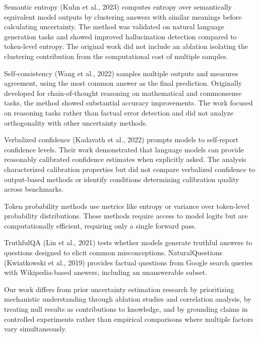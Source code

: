 
Semantic entropy (Kuhn et al., 2023) computes entropy over semantically equivalent model outputs by clustering answers with similar meanings before calculating uncertainty. The method was validated on natural language generation tasks and showed improved hallucination detection compared to token-level entropy. The original work did not include an ablation isolating the clustering contribution from the computational cost of multiple samples.

Self-consistency (Wang et al., 2022) samples multiple outputs and measures agreement, using the most common answer as the final prediction. Originally developed for chain-of-thought reasoning on mathematical and commonsense tasks, the method showed substantial accuracy improvements. The work focused on reasoning tasks rather than factual error detection and did not analyze orthogonality with other uncertainty methods.

Verbalized confidence (Kadavath et al., 2022) prompts models to self-report confidence levels. Their work demonstrated that language models can provide reasonably calibrated confidence estimates when explicitly asked. The analysis characterized calibration properties but did not compare verbalized confidence to output-based methods or identify conditions determining calibration quality across benchmarks.

Token probability methods use metrics like entropy or variance over token-level probability distributions. These methods require access to model logits but are computationally efficient, requiring only a single forward pass.

TruthfulQA (Lin et al., 2021) tests whether models generate truthful answers to questions designed to elicit common misconceptions. NaturalQuestions (Kwiatkowski et al., 2019) provides factual questions from Google search queries with Wikipedia-based answers, including an unanswerable subset.

Our work differs from prior uncertainty estimation research by prioritizing mechanistic understanding through ablation studies and correlation analysis, by treating null results as contributions to knowledge, and by grounding claims in controlled experiments rather than empirical comparisons where multiple factors vary simultaneously.
